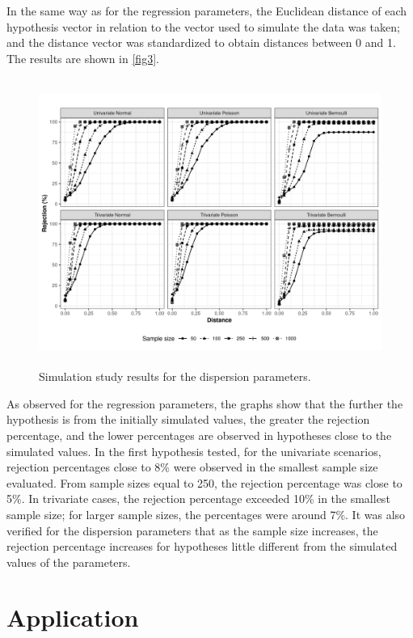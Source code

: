 \documentclass[USenglish]{article}
\theoremstyle{dgthm}
\theoremstyle{dgdef}
\begin{document}
In the same way as for the regression parameters, the Euclidean distance of each hypothesis vector in relation to the vector used to simulate the data was taken; and the distance vector was standardized to obtain distances between 0 and 1. The results are shown in \autoref{fig3}.

\begin{figure}[H]
\centering
\includegraphics[width=29.6pc,height=22.2pc]{FIGURES/FIGURE3.jpeg}
\caption{Simulation study results for the dispersion parameters.\label{fig3}}
\end{figure}

As observed for the regression parameters, the graphs show that the further the hypothesis is from the initially simulated values, the greater the rejection percentage, and the lower percentages are observed in hypotheses close to the simulated values. In the first hypothesis tested, for the univariate scenarios, rejection percentages close to 8\% were observed in the smallest sample size evaluated. From sample sizes equal to 250, the rejection percentage was close to 5\%. In trivariate cases, the rejection percentage exceeded 10\% in the smallest sample size; for larger sample sizes, the percentages were around 7\%. It was also verified for the dispersion parameters that as the sample size increases, the rejection percentage increases for hypotheses little different from the simulated values of the parameters.


\section{Application}\label{sec6}
\end{document}
